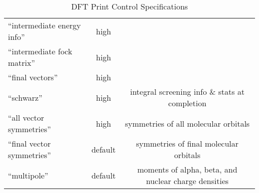 \begin{table}[htbp]
\begin{center}
\begin{tabular}{lcc}
 ``intermediate energy info''       & high        & \\
 ``intermediate fock matrix''       & high        & \\
 ``final vectors''                  & high        & \\
 ``schwarz''                        & high        & integral screening info \& stats at completion\\
 ``all vector symmetries''          & high        & symmetries of all molecular orbitals \\
 ``final vector symmetries''        & default     & symmetries of final molecular orbitals \\
 ``multipole''                      & default     & moments of alpha, beta, and nuclear charge densities \\
\end{tabular}
\end{center}
\caption{DFT Print Control Specifications}
\end{table}




